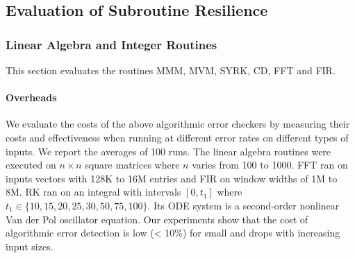 \documentclass{sig-alternate}
\begin{document}
{\subsection{Evaluation of Subroutine Resilience}
\label{sec:res_tech:eval}



\subsubsection{Linear Algebra and Integer Routines}
\label{sec:res_tech:eval:la_int}

This section evaluates the routines MMM, MVM, SYRK, CD, FFT and FIR.

\paragraph{Overheads}


We evaluate the costs of the above algorithmic error checkers by measuring their costs and effectiveness when running at different error rates on different types of inputs.
We report the averages of 100 runs.
The linear algebra routines were executed on $n \times n$ square matrices where $n$ varies from 100 to 1000.
FFT ran on inputs vectors with 128K to 16M entries and FIR on window widths of 1M to 8M.
RK ran on an integral with intervals $[0, t_1]$ where $t_1 \in \{10, 15, 20, 25, 30, 50, 75, 100\}$.
Its ODE system is a second-order nonlinear Van der Pol oscillator equation.
Our experiments show that the cost of algorithmic error detection is low (< 10\%) for small and drops with increasing input sizes.

}
\end{document}
